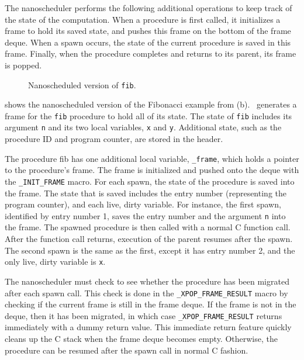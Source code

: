 The nanoscheduler performs the following additional operations to keep
track of the state of the computation.  When a procedure is first
called, it initializes a frame to hold its saved state, and pushes
this frame on the bottom of the frame deque.  When a spawn occurs, the
state of the current procedure is saved in this frame.  Finally, when
the procedure completes and returns to its parent, its frame is
popped.

\begin{figure}
{\small }
\caption{\small Nanoscheduled version of \texttt{fib}.}
\label{fig:nanofib}
\end{figure}

 shows the nanoscheduled version of the Fibonacci
example from (b).  \cilktoc\ generates a frame for the
{\tt fib} procedure to hold all of its state.  The state of {\tt fib}
includes its argument {\tt n} and its two local variables, {\tt x} and
{\tt y}.  Additional state, such as the procedure ID and program
counter, are stored in the header.

The procedure fib has one additional local variable,
\texttt{\_frame}, which holds a
pointer to the procedure's frame.  The frame is initialized and pushed
onto the deque with the
\texttt{\_INIT\_FRAME}
macro.  For each spawn, the state of the procedure is saved into the
frame.  The state that is saved includes the entry number
(representing the program counter), and each live, dirty variable.
For instance, the first spawn, identified by entry number 1, saves the
entry number and the argument {\tt n} into the frame.  The spawned
procedure is then called with a normal C function call.  After the
function call returns, execution of the parent resumes after the
spawn.  The second spawn is the same as the first, except it has entry
number 2, and the only live, dirty variable is {\tt x}.

The nanoscheduler must check to see whether the procedure has been
migrated after each spawn call.  This check is done in the
\texttt{\_XPOP\_FRAME\_RESULT}
macro by checking if the current frame is still in the frame deque.
If the frame is not in the deque, then it has been migrated, in which
case {\tt \_XPOP\_FRAME\_RESULT} returns immediately with a dummy
return value. This immediate return feature quickly cleans up the C
stack when the frame deque becomes empty.  Otherwise, the procedure
can be resumed after the spawn call in normal C fashion.

